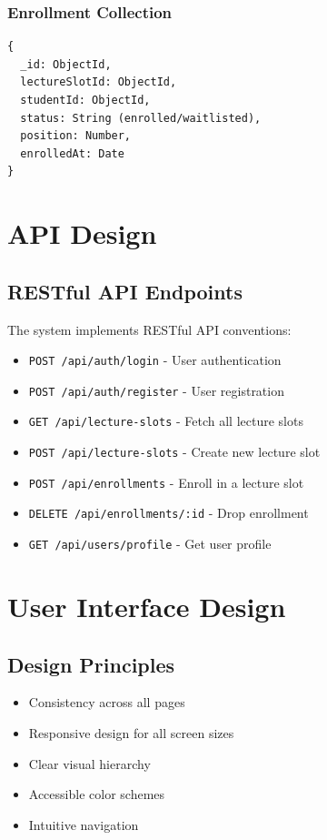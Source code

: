 \documentclass[12pt,a4paper]{report}
\begin{document}
\subsubsection{Enrollment Collection}
\begin{verbatim}
{
  _id: ObjectId,
  lectureSlotId: ObjectId,
  studentId: ObjectId,
  status: String (enrolled/waitlisted),
  position: Number,
  enrolledAt: Date
}
\end{verbatim}

\section{API Design}

\subsection{RESTful API Endpoints}
The system implements RESTful API conventions:
\begin{itemize}[leftmargin=*]
    \item \texttt{POST /api/auth/login} - User authentication
    \item \texttt{POST /api/auth/register} - User registration
    \item \texttt{GET /api/lecture-slots} - Fetch all lecture slots
    \item \texttt{POST /api/lecture-slots} - Create new lecture slot
    \item \texttt{POST /api/enrollments} - Enroll in a lecture slot
    \item \texttt{DELETE /api/enrollments/:id} - Drop enrollment
    \item \texttt{GET /api/users/profile} - Get user profile
\end{itemize}

\section{User Interface Design}

\subsection{Design Principles}
\begin{itemize}[leftmargin=*]
    \item Consistency across all pages
    \item Responsive design for all screen sizes
    \item Clear visual hierarchy
    \item Accessible color schemes
    \item Intuitive navigation
\end{itemize}
\end{document}

